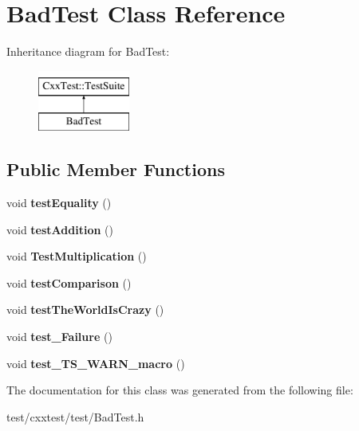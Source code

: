 \hypertarget{classBadTest}{\section{Bad\-Test Class Reference}
\label{classBadTest}
}
Inheritance diagram for Bad\-Test\-:\begin{figure}[H]
\begin{center}
\leavevmode
\includegraphics[height=2.000000cm]{classBadTest}
\end{center}
\end{figure}
\subsection*{Public Member Functions}
\begin{DoxyCompactItemize}
\item 
\hypertarget{classBadTest_a4b5757bbb2a54f121aa55245358b5bc6}{void {\bfseries test\-Equality} ()}\label{classBadTest_a4b5757bbb2a54f121aa55245358b5bc6}

\item 
\hypertarget{classBadTest_a535c1cbb86415ad35fc13378f75bb075}{void {\bfseries test\-Addition} ()}\label{classBadTest_a535c1cbb86415ad35fc13378f75bb075}

\item 
\hypertarget{classBadTest_a58cdf63e9c6a42259d35585afdedb6e8}{void {\bfseries Test\-Multiplication} ()}\label{classBadTest_a58cdf63e9c6a42259d35585afdedb6e8}

\item 
\hypertarget{classBadTest_ab0696b9b32488d8433eafe1e8da78ab3}{void {\bfseries test\-Comparison} ()}\label{classBadTest_ab0696b9b32488d8433eafe1e8da78ab3}

\item 
\hypertarget{classBadTest_a7eadd8682a1ea41dbf9b9ebd4930acb5}{void {\bfseries test\-The\-World\-Is\-Crazy} ()}\label{classBadTest_a7eadd8682a1ea41dbf9b9ebd4930acb5}

\item 
\hypertarget{classBadTest_a576ec735bc1935207f69b8712c506ad0}{void {\bfseries test\-\_\-\-Failure} ()}\label{classBadTest_a576ec735bc1935207f69b8712c506ad0}

\item 
\hypertarget{classBadTest_a9544f4c35e602de53443d0fe4513618d}{void {\bfseries test\-\_\-\-T\-S\-\_\-\-W\-A\-R\-N\-\_\-macro} ()}\label{classBadTest_a9544f4c35e602de53443d0fe4513618d}

\end{DoxyCompactItemize}


The documentation for this class was generated from the following file\-:\begin{DoxyCompactItemize}
\item 
test/cxxtest/test/Bad\-Test.\-h\end{DoxyCompactItemize}
